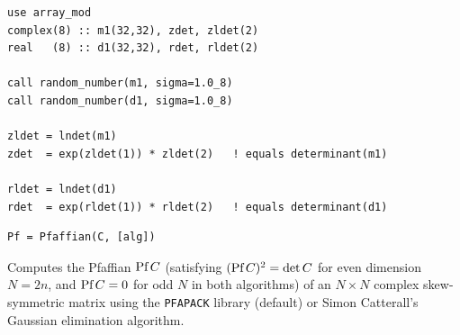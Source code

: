 \begin{description}[leftmargin=2.2cm, style=nextline]
\end{description}

\lstset{language=[95]Fortran}
\begin{lstlisting}
use array_mod
complex(8) :: m1(32,32), zdet, zldet(2)
real   (8) :: d1(32,32), rdet, rldet(2)

call random_number(m1, sigma=1.0_8)
call random_number(d1, sigma=1.0_8)

zldet = lndet(m1)
zdet  = exp(zldet(1)) * zldet(2)   ! equals determinant(m1)

rldet = lndet(d1)
rdet  = exp(rldet(1)) * rldet(2)   ! equals determinant(d1)
\end{lstlisting}


\lstset{language=[95]Fortran}
\begin{lstlisting}
Pf = Pfaffian(C, [alg])
\end{lstlisting}

Computes the Pfaffian $\text{Pf}\, C$ (satisfying $(\text{Pf}\, C)^2 = \det C$ for even dimension $N = 2n$, and $\text{Pf}\, C = 0$ for odd $N$ in both algorithms) of an $N\times N$ complex skew-symmetric matrix  using the \texttt{PFAPACK} library (default) or Simon Catterall's Gaussian elimination algorithm.

